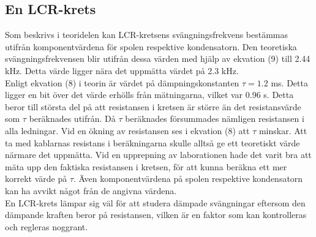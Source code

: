 \documentclass[a4paper,10pt]{article}
\begin{document}
\subsection{En LCR-krets}
Som beskrivs i teoridelen kan LCR-kretsens svängningsfrekvens bestämmas utifrån komponentvärdena för spolen respektive kondensatorn. Den teoretiska svängningsfrekvensen blir utifrån dessa värden med hjälp av ekvation (9) till 2.44 kHz. Detta värde ligger nära det uppmätta värdet på 2.3 kHz.\\
\indent Enligt ekvation (8) i teorin är värdet på dämpningskonstanten $\tau = 1.2 $ ms. Detta ligger en bit över det värde erhölls från mätningarna, vilket var 0.96 s. Detta beror till största del på att resistansen i kretsen är större än det resistansvärde som $\tau$ beräknades utifrån. Då $\tau$ beräknades försummades nämligen resistansen i alla ledningar. Vid en ökning av resistansen ses i ekvation (8) att $\tau$ minskar. Att ta med kablarnas resistans i beräkningarna skulle alltså ge ett teoretiskt värde närmare det uppmätta. Vid en upprepning av laborationen hade det varit bra att mäta upp den faktiska resistansen i kretsen, för att kunna beräkna ett mer korrekt värde på $\tau$. Även komponentvärdena på spolen respektive kondensatorn kan ha avvikt något från de angivna värdena.\\
\indent En LCR-krets lämpar sig väl för att studera dämpade svängningar eftersom den dämpande kraften beror på resistansen, vilken är en faktor som kan kontrolleras och regleras noggrant.
\end{document}
